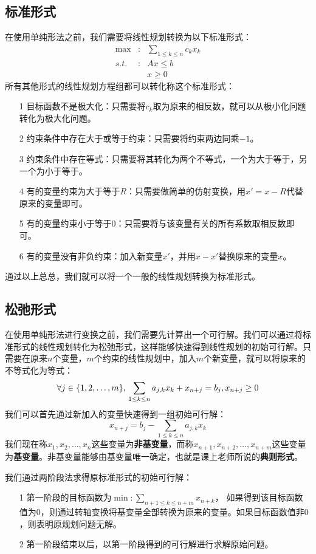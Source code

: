\subsection{标准形式}
在使用单纯形法之前，我们需要将线性规划转换为以下标准形式：
$$
\begin{matrix}
\max&: & \sum\limits_{1 \le k \le n}c_{k}x_{k}\\
s.t.&: & Ax \le b \\
&  & x \ge 0
\end{matrix}
$$
所有其他形式的线性规划方程组都可以转化称这个标准形式：
\begin{itemize}
	\item[1] 目标函数不是极大化：只需要将$c_k$取为原来的相反数，就可以从极小化问题转化为极大化问题。
	\item[2] 约束条件中存在大于或等于约束：只需要将约束两边同乘$-1$。
	\item[3] 约束条件中存在等式：只需要将其转化为两个不等式，一个为大于等于，另一个为小于等于。
	\item[4] 有的变量约束为大于等于$R$：只需要做简单的仿射变换，用$x' = x - R$代替原来的变量即可。
	\item[5] 有的变量约束小于等于$0$：只需要将与该变量有关的所有系数取相反数即可。
	\item[6] 有的变量没有非负约束：加入新变量$x'$，并用$x - x'$替换原来的变量$x$。
\end{itemize}


通过以上总总，我们就可以将一个一般的线性规划转换为标准形式。

\subsection{松弛形式}
在使用单纯形法进行变换之前，我们需要先计算出一个可行解。我们可以通过将标准形式的线性规划转化为松弛形式，这样能够快速得到线性规划的初始可行解。只需要在原来$n$个变量，$m$个约束的线性规划中，加入$m$个新变量，就可以将原来的不等式化为等式：
$$
\forall j \in \{1, 2, \dots, m\}, \\
\sum\limits_{1 \le k \le n} a_{j, k}x_{k} + x_{n+j} = b_{j}, \\
x_{n+j} \ge 0
$$
我们可以首先通过新加入的变量快速得到一组初始可行解：
$$
x_{n+j} = b_{j} - \sum\limits_{1 \le k \le n} a_{j,k}x_{k}
$$
我们现在称$x_{1}, x_{2}, \dots, x_{n}$这些变量为\textbf{非基变量}，而称$x_{n+1}, x_{n+2}, \dots, x_{n+m}$这些变量为\textbf{基变量}。非基变量能够由基变量唯一确定，也就是课上老师所说的\textbf{典则形式}。

我们通过两阶段法求得原标准形式的初始可行解：
\begin{itemize}
	\item[1] 第一阶段的目标函数为$\min: \sum\limits_{n+1 \le k \le n+m}x_{n+k}$， 如果得到该目标函数值为$0$，则通过转轴变换将基变量全部转换为原来的变量。如果目标函数值非$0$，则表明原规划问题无解。
	\item[2] 第一阶段结束以后，以第一阶段得到的可行解进行求解原始问题。
\end{itemize}

